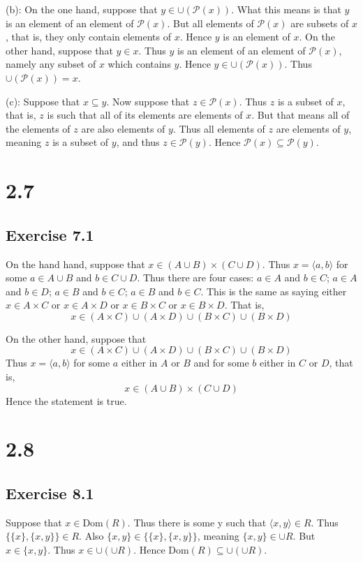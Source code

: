 \documentclass{article}
\theoremstyle{definition}
\begin{document}
(b): On the one hand, suppose that $y\in\cup(\mathcal{P}(x))$. What this means is that $y$ is an element of an element of $\mathcal{P}(x)$. But all elements of 
$\mathcal{P}(x)$ are subsets of $x$, that is, they only contain elements of $x$. Hence $y$ is an element of $x$. On the other hand, suppose that $y\in x$. Thus $y$ 
is an element of an element of $\mathcal{P}(x)$, namely any subset of $x$ which contains $y$. Hence $y\in\cup(\mathcal{P}(x))$. Thus $\cup(\mathcal{P}(x))=x$.


(c): Suppose that $x\subseteq y$. Now suppose that $z\in\mathcal{P}(x)$. Thus $z$ is a subset of $x$, that is, $z$ is such that all of its elements are elements of 
$x$. But that means all of the elements of $z$ are also elements of $y$. Thus all elements of $z$ are elements of $y$, meaning $z$ is a subset of $y$, and thus 
$z\in\mathcal{P}(y)$. Hence $\mathcal{P}(x)\subseteq\mathcal{P}(y)$.

\section*{2.7}

\subsection*{Exercise 7.1}
On the hand hand, suppose that $x\in (A\cup B)\times (C\cup D)$. Thus $x=\langle a,b\rangle$ for some $a\in A\cup B$ and 
$b\in C\cup D$. Thus there are four cases: $a\in A$ and $b\in C$; $a\in A$ and $b\in D$; $a\in B$ and $b\in C$; $a\in B$ and $b\in C$. This is the same as saying 
either $x\in A\times C$ or $x\in A\times D$ or $x\in B\times C$ or $x\in B\times D$. That is, 
\[ x\in (A\times C)\cup (A\times D)\cup (B\times C)\cup (B\times D) \]


On the other hand, suppose that \[ x\in (A\times C)\cup (A\times D)\cup(B\times C)\cup(B\times D) \]
Thus $x=\langle a,b\rangle$ for some $a$ either in $A$ or $B$ and for some $b$ either in $C$ or $D$, that is, 
\[ x\in (A\cup B)\times (C\cup D) \] Hence the statement is true.

\section*{2.8}

\subsection*{Exercise 8.1}
Suppose that $x\in\textrm{Dom}(R)$. Thus there is some y such that $\langle x,y\rangle\in R$. Thus 
$\{\{x\},\{x,y\}\}\in R$. Also $\{x,y\}\in\{\{x\},\{x,y\}\}$, meaning $\{x,y\}\in\cup R$. But $x\in\{x,y\}$. Thus $x\in\cup(\cup R)$. Hence 
$\textrm{Dom}(R)\subseteq\cup(\cup R)$.
\end{document}
